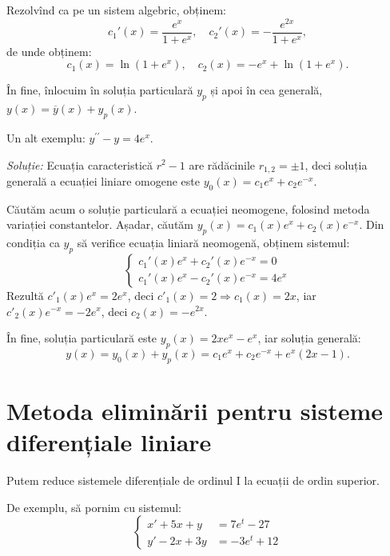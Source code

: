Rezolvînd ca pe un sistem algebric, obținem:
\[
  c_1'(x) = \frac{e^x}{1 + e^x}, \quad c_2'(x) = -\frac{e^{2x}}{1 + e^x},
\]
de unde obținem:
\[
  c_1(x) = \ln(1 + e^x), \quad c_2(x) = -e^x + \ln(1 + e^x).
\]

În fine, înlocuim în soluția particulară $y_p$ și apoi în cea generală,
$y(x) = \overline{y}(x) + y_p(x)$.

\vspace{1cm}

Un alt exemplu: $y^{\prime\prime} - y = 4e^x$.

\emph{Soluție:} Ecuația caracteristică $r^2 - 1$ are rădăcinile $r_{1,2} = \pm 1$,
deci soluția generală a ecuației liniare omogene este $y_0(x) = c_1 e^x + c_2e^{-x}$.

Căutăm acum o soluție particulară a ecuației neomogene, folosind metoda variației
constantelor. Așadar, căutăm $y_p(x) = c_1(x) e^x + c_2(x) e^{-x}$. Din condiția
ca $y_p$ să verifice ecuația liniară neomogenă, obținem sistemul:
\[
  \begin{cases}
    c_1'(x) e^x + c_2'(x) e^{-x} = 0 \\
    c_1'(x) e^x - c_2'(x) e^{-x} = 4e^x
  \end{cases}
\]
Rezultă $c'_1(x)e^x = 2e^x$, deci $c'_1(x) = 2 \Rightarrow c_1(x) = 2x$, iar
$c'_2(x) e^{-x} = -2e^x$, deci $c_2(x) = -e^{2x}$.

În fine, soluția particulară este $y_p(x) = 2xe^x - e^x$, iar soluția generală:
\[
  y(x) = y_0(x) + y_p(x) = c_1e^x + c_2 e^{-x} + e^x(2x - 1).
\]



\section{Metoda eliminării pentru sisteme diferențiale liniare}

Putem reduce sistemele diferențiale de ordinul I la ecuații de ordin superior.

De exemplu, să pornim cu sistemul:
\[
  \begin{cases}
    x' + 5x + y &= 7e^t - 27 \\
    y' - 2x + 3y &= -3e^t + 12
  \end{cases}
\]

